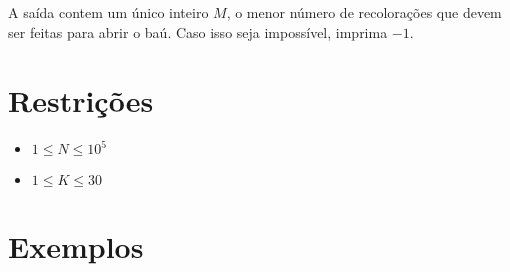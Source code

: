 A saída contem um único inteiro $M$, o menor número de recolorações que devem ser feitas para abrir o baú.
Caso isso seja impossível, imprima $-1$.

\section*{Restrições}

\begin{itemize}
\item $1 \leq N \leq 10^5$
\item $1 \leq K \leq 30$
\end{itemize}


\section*{Exemplos}

\exemplo
